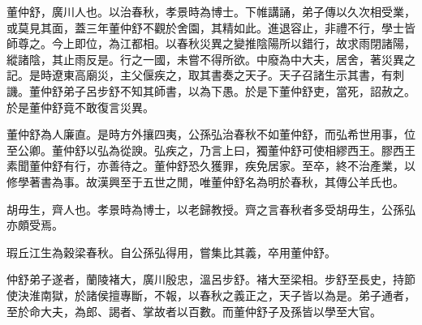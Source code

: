 董仲舒，廣川人也。以治春秋，孝景時為博士。下帷講誦，弟子傳以久次相受業，或莫見其面，蓋三年董仲舒不觀於舍園，其精如此。進退容止，非禮不行，學士皆師尊之。今上即位，為江都相。以春秋災異之變推陰陽所以錯行，故求雨閉諸陽，縱諸陰，其止雨反是。行之一國，未嘗不得所欲。中廢為中大夫，居舍，著災異之記。是時遼東高廟災，主父偃疾之，取其書奏之天子。天子召諸生示其書，有刺譏。董仲舒弟子呂步舒不知其師書，以為下愚。於是下董仲舒吏，當死，詔赦之。於是董仲舒竟不敢復言災異。

董仲舒為人廉直。是時方外攘四夷，公孫弘治春秋不如董仲舒，而弘希世用事，位至公卿。董仲舒以弘為從諛。弘疾之，乃言上曰，獨董仲舒可使相繆西王。膠西王素聞董仲舒有行，亦善待之。董仲舒恐久獲罪，疾免居家。至卒，終不治產業，以修學著書為事。故漢興至于五世之閒，唯董仲舒名為明於春秋，其傳公羊氏也。

胡毋生，齊人也。孝景時為博士，以老歸教授。齊之言春秋者多受胡毋生，公孫弘亦頗受焉。

瑕丘江生為穀梁春秋。自公孫弘得用，嘗集比其義，卒用董仲舒。

仲舒弟子遂者，蘭陵褚大，廣川殷忠，溫呂步舒。褚大至梁相。步舒至長史，持節使決淮南獄，於諸侯擅專斷，不報，以春秋之義正之，天子皆以為是。弟子通者，至於命大夫，為郎、謁者、掌故者以百數。而董仲舒子及孫皆以學至大官。